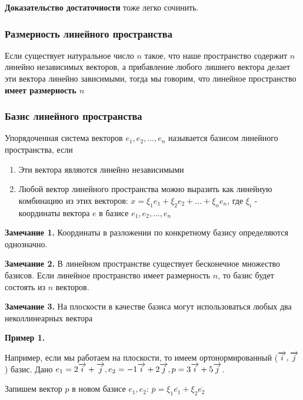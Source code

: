 \documentclass{article}
\def\vec{\ensuremath\overrightarrow}
\begin{document}
\begin{flushleft}
\hfill

\textbf{Доказательство достаточности} тоже легко сочинить.

\subsubsection{Размерность линейного пространства}

Если существует натуральное число $n$ такое, что наше пространство содержит $n$ линейно независимых векторов, а прибавление любого лишнего вектора делает эти вектора линейно зависимыми, тогда мы говорим, что линейное пространство \textbf{имеет размерность $n$}

\subsubsection{Базис линейного пространства}

Упорядоченная система векторов $e_1, e_2, ..., e_n$ называется базисом линейного пространства, если

\begin{enumerate}
    \item Эти вектора являются линейно независимыми
    \item Любой вектор линейного пространства можно выразить как линейную комбинацию из этих векторов: $x = \xi_1 e_1 + \xi_2 e_2 + ... + \xi_n e_n$, где $\xi_i$ - координаты вектора $e$ в базисе $e_1,e_2,...,e_n$
\end{enumerate}

\textbf{Замечание 1. } Координаты в разложении по конкретному базису определяются однозначно.

\textbf{Замечание 2. } В линейном пространстве существует бесконечное множество базисов. Если линейное пространство имеет размерность $n$, то базис будет состоять из $n$ векторов.

\textbf{Замечание 3.} На плоскости в качестве базиса могут использоваться любых два неколлинеарных вектора

\hfill

\textbf{Пример 1.}
\hfill

Например, если мы работаем на плоскости, то имеем ортонормированный ($\vec{i}, \vec{j}$) базис. Дано $e_1 = 2 \vec{i} + \vec{j}, e_2 = -1\vec{i} + 2\vec{j}, p = 3\vec{i} + 5\vec{j}$.

Запишем вектор $p$ в новом базисе $e_1, e_2$: $\overline{p} = \xi_1 \overline{e_1} + \xi_2 \overline{e_2}$

\hfill


\end{flushleft}
\end{document}
